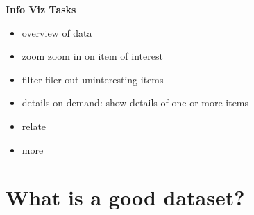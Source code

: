 \documentclass[]{article}
\begin{document}
\textbf{Info Viz Tasks}
\begin{itemize}
\setlength\itemsep{0em}
	\item overview of data
	\item zoom zoom in on item of interest
	\item  filter filer out uninteresting items
	\item details on demand: show details of one or more items
	\item relate
	\item more
\end{itemize}

\section{What is a good dataset?}
\end{document}
